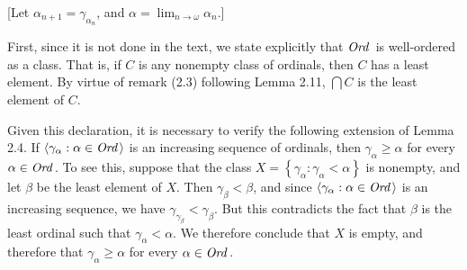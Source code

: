 [Let $\alpha_{n + 1} = \gamma_{\alpha_n}$, and 
$\alpha = \lim_{n \rightarrow \omega} \alpha_n$.]
\begin{solution}
First, since it is not done in the text, we state explicitly that $\textit{Ord\,}$ is 
well-ordered as a class. That is, if $C$ is any nonempty class of ordinals, 
then $C$ has a least element. By virtue of remark (2.3) following Lemma 2.11,
 $\bigcap C$ is the least element of $C$.

Given this declaration, it is necessary to verify the following extension of 
Lemma 2.4. If $\langle \gamma_{\alpha} : \alpha \in \textit{Ord\,} \rangle$ is an 
increasing sequence of ordinals, then $\gamma_{\alpha} \geq \alpha$ for every 
$\alpha \in \textit{Ord\,}$. To see this, suppose that the class 
$X = \left \{ \gamma_{\alpha} : \gamma_{\alpha} < \alpha \right \}$ is 
nonempty, and let $\beta$ be the least element of $X$. Then 
$\gamma_{\beta} < \beta$, and since 
$\langle \gamma_{\alpha} : \alpha \in \textit{Ord\,} \rangle$ is an increasing sequence, 
we have $\gamma_{\gamma_{\beta}} < \gamma_{\beta}$. But this contradicts the 
fact that $\beta$ is the least ordinal such that $\gamma_{\alpha} < \alpha$. 
We therefore conclude that $X$ is empty, and therefore that 
$\gamma_{\alpha} \geq \alpha$ for every $\alpha \in \textit{Ord\,}$.


\end{solution}
